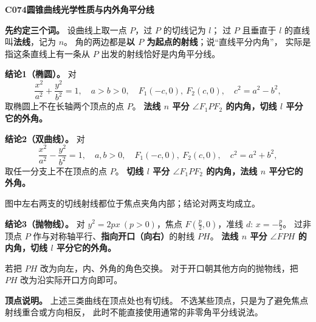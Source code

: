 \begin{statementbox}
\textbf{C074\quad 圆锥曲线光学性质与内外角平分线}

\textbf{先约定三个词。} 设曲线上取一点 $P$，过 $P$ 的切线记为 $l$；
过 $P$ 且垂直于 $l$ 的直线叫\textbf{法线}，记为 $n$。
角的两边都是\textbf{以 $P$ 为起点的射线}；说“直线平分内角”，
实际是指这条直线上有一条从 $P$ 出发的射线恰好是内角平分线。

\textbf{结论1（椭圆）。} 对
\[
\frac{x^2}{a^2}+\frac{y^2}{b^2}=1,\quad a>b>0,\quad
F_1(-c,0),\ F_2(c,0),\quad c^2=a^2-b^2,
\]
取椭圆上不在长轴两个顶点的点 $P$。
\textbf{法线 $n$ 平分 $\angle F_1PF_2$ 的内角，切线 $l$ 平分它的外角。}

\begin{center}\end{center}

\begin{minipage}{\linewidth}
\textbf{结论2（双曲线）。} 对
\[
\frac{x^2}{a^2}-\frac{y^2}{b^2}=1,\quad a,b>0,\quad
F_1(-c,0),\ F_2(c,0),\quad c^2=a^2+b^2,
\]
取任一分支上不在顶点的点 $P$。
\textbf{切线 $l$ 平分 $\angle F_1PF_2$ 的内角，法线 $n$ 平分它的外角。}
\begin{center}\end{center}
图中左右两支的切线射线都位于焦点夹角内部；结论对两支均成立。
\end{minipage}\par\medskip

\begin{minipage}{\linewidth}
\textbf{结论3（抛物线）。} 对 $y^2=2px\ (p>0)$，焦点
$F(\tfrac p2,0)$，准线 $d:\,x=-\tfrac p2$。
过非顶点 $P$ 作与对称轴平行、\textbf{指向开口（向右）}的射线 $PH$。
\textbf{法线 $n$ 平分 $\angle FPH$ 的内角，切线 $l$ 平分它的外角。}
\begin{center}\end{center}
若把 $PH$ 改为向左，内、外角的角色交换。
对于开口朝其他方向的抛物线，把 $PH$ 改为沿实际开口方向即可。
\end{minipage}\par\medskip

\textbf{顶点说明。} 上述三类曲线在顶点处也有切线。
不选某些顶点，只是为了避免焦点射线重合或方向相反，
此时不能直接使用通常的非零角平分线说法。
\end{statementbox}
